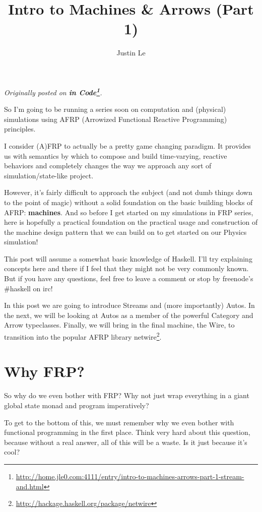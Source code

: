 \documentclass[]{article}
\title{Intro to Machines \& Arrows (Part 1)}
\author{Justin Le}
\renewcommand{\href}[2]{#2\footnote{\url{#1}}}
\begin{document}
\maketitle

\emph{Originally posted on
\textbf{\href{http://home.jle0.com:4111/entry/intro-to-machines-arrows-part-1-stream-and.html}{in
Code}}.}

So I'm going to be running a series soon on computation and (physical) simulations using AFRP
(Arrowized Functional Reactive Programming) principles.

I consider (A)FRP to actually be a pretty game changing paradigm. It provides us with semantics by
which to compose and build time-varying, reactive behaviors and completely changes the way we
approach any sort of simulation/state-like project.

However, it's fairly difficult to approach the subject (and not dumb things down to the point of
magic) without a solid foundation on the basic building blocks of AFRP: \textbf{machines}. And so
before I get started on my simulations in FRP series, here is hopefully a practical foundation on
the practical usage and construction of the machine design pattern that we can build on to get
started on our Physics simulation!

This post will assume a somewhat basic knowledge of Haskell. I'll try explaining concepts here and
there if I feel that they might not be very commonly known. But if you have any questions, feel free
to leave a comment or stop by freenode's \#haskell on irc!

In this post we are going to introduce Streams and (more importantly) Autos. In the next, we will be
looking at Autos as a member of the powerful Category and Arrow typeclasses. Finally, we will bring
in the final machine, the Wire, to transition into the popular AFRP library
\href{http://hackage.haskell.org/package/netwire}{netwire}.

\section{Why FRP?}\label{why-frp}

So why do we even bother with FRP? Why not just wrap everything in a giant global state monad and
program imperatively?

To get to the bottom of this, we must remember why we even bother with functional programming in the
first place. Think very hard about this question, because without a real answer, all of this will be
a waste. Is it just because it's cool?
\end{document}
